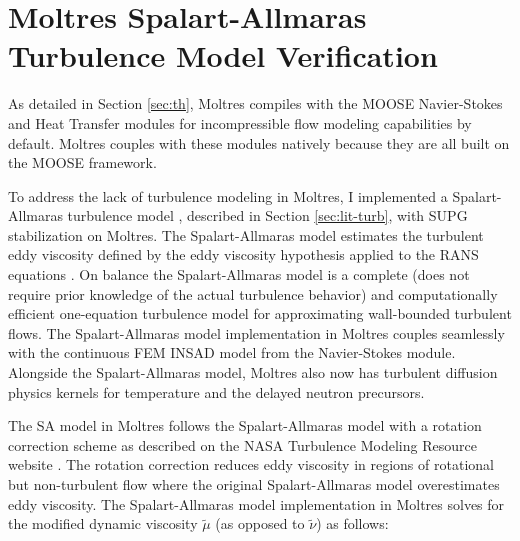 \section{Moltres Spalart-Allmaras Turbulence Model Verification} \label{sec:turbulence}

As detailed in Section \ref{sec:th}, Moltres compiles with the MOOSE Navier-Stokes
\cite{peterson_overview_2018} and Heat Transfer modules for incompressible flow
modeling capabilities by default. Moltres couples with these modules natively because they are all
built on the MOOSE framework.

To address the lack of turbulence modeling in Moltres, I implemented a Spalart-Allmaras turbulence model
\cite{spalart_one-equation_1994}, described in Section \ref{sec:lit-turb}, with \gls{SUPG}
stabilization on Moltres. The Spalart-Allmaras model estimates the turbulent eddy viscosity defined by the
eddy viscosity hypothesis applied to the \gls{RANS} equations \cite{rodi_turbulence_2017}.
On balance the Spalart-Allmaras model is a complete (does not require prior
knowledge of the actual turbulence behavior) and computationally efficient one-equation turbulence
model for approximating wall-bounded turbulent flows. The Spalart-Allmaras model implementation in Moltres
couples seamlessly with the continuous \gls{FEM} \gls{INSAD}
\cite{peterson_overview_2018, lindsay_automatic_2021} model
from the Navier-Stokes module. Alongside the Spalart-Allmaras model, Moltres also now has turbulent
diffusion physics kernels for temperature and the delayed neutron precursors.

The SA model in Moltres follows the Spalart-Allmaras model with a rotation correction scheme
\cite{aupoix_extensions_2003, dacles-mariani_numericalexperimental_1995} as described on the
\gls{NASA} Turbulence Modeling Resource website \cite{rumsey_turbulence_nodate}. The rotation
correction reduces eddy viscosity in regions of rotational but non-turbulent flow where the
original Spalart-Allmaras model overestimates eddy viscosity. The Spalart-Allmaras model implementation in Moltres
solves for the modified dynamic viscosity $\tilde{\mu}$ (as opposed to $\tilde{\nu}$) as follows:

